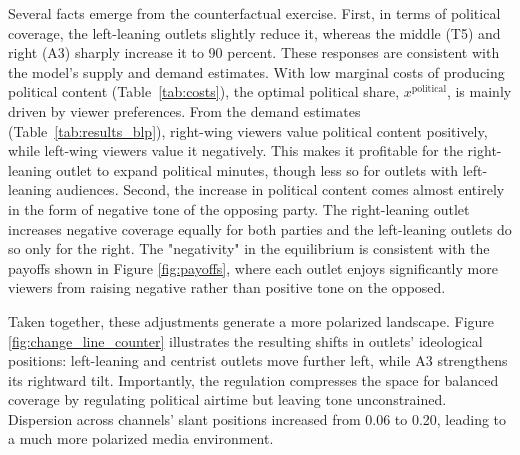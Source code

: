 \documentclass[12pt]{article}
\begin{document}


Several facts emerge from the counterfactual exercise. First, in terms of political coverage, the left-leaning outlets slightly reduce it, whereas the middle (T5) and right (A3) sharply increase it to 90 percent. These responses are consistent with the model’s supply and demand estimates. With low marginal costs of producing political content (Table~\ref{tab:costs}), the optimal political share, $x^{\text{political}}$, is mainly driven by viewer preferences. From the demand estimates (Table~\ref{tab:results_blp}), right-wing viewers value political content positively, while left-wing viewers value it negatively. This makes it profitable for the right-leaning outlet to expand political minutes, though less so for outlets with left-leaning audiences. Second, the increase in political content comes almost entirely in the form of negative tone of the opposing party. The right-leaning outlet increases negative coverage equally for both parties and the left-leaning outlets do so only for the right. The "negativity" in the equilibrium is consistent with the payoffs shown in Figure \ref{fig:payoffs}, where each outlet enjoys significantly more viewers from raising negative rather than positive tone on the opposed. 



Taken together, these adjustments generate a  more polarized landscape. Figure \ref{fig:change_line_counter} illustrates the resulting shifts in outlets’ ideological positions: left-leaning and centrist outlets move further left, while A3 strengthens its rightward tilt. Importantly, the regulation compresses the space for balanced coverage by regulating political airtime but leaving tone unconstrained. Dispersion across channels' slant positions increased from 0.06 to 0.20, leading to a much more polarized media environment.
\end{document}
